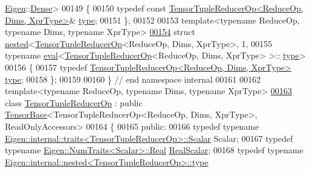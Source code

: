 \begin{DoxyCode}
      \hyperlink{namespace_eigen}{Eigen}::\hyperlink{struct_eigen_1_1_dense}{Dense}>
00149 \{
00150   \textcolor{keyword}{typedef} \textcolor{keyword}{const} \hyperlink{class_eigen_1_1_tensor_tuple_reducer_op}{TensorTupleReducerOp<ReduceOp, Dims, XprType>}&
       \hyperlink{class_eigen_1_1_tensor_tuple_reducer_op}{type};
00151 \};
00152 
00153 \textcolor{keyword}{template}<\textcolor{keyword}{typename} ReduceOp, \textcolor{keyword}{typename} Dims, \textcolor{keyword}{typename} XprType>
\hyperlink{struct_eigen_1_1internal_1_1nested_3_01_tensor_tuple_reducer_op_3_01_reduce_op_00_01_dims_00_01_821bbc2beef8f62325eb5ce9ac37fcf5}{00154} \textcolor{keyword}{struct }\hyperlink{struct_eigen_1_1internal_1_1nested}{nested}<\hyperlink{class_eigen_1_1_tensor_tuple_reducer_op}{TensorTupleReducerOp}<ReduceOp, Dims, XprType>, 1,
00155               typename \hyperlink{struct_eigen_1_1internal_1_1eval}{eval}<\hyperlink{class_eigen_1_1_tensor_tuple_reducer_op}{TensorTupleReducerOp}<ReduceOp, Dims, XprType> >::
      \hyperlink{class_eigen_1_1_tensor_tuple_reducer_op}{type}>
00156 \{
00157   \textcolor{keyword}{typedef} \hyperlink{class_eigen_1_1_tensor_tuple_reducer_op}{TensorTupleReducerOp<ReduceOp, Dims, XprType>} 
      \hyperlink{class_eigen_1_1_tensor_tuple_reducer_op}{type};
00158 \};
00159 
00160 \}  \textcolor{comment}{// end namespace internal}
00161 
00162 \textcolor{keyword}{template}<\textcolor{keyword}{typename} ReduceOp, \textcolor{keyword}{typename} Dims, \textcolor{keyword}{typename} XprType>
\hyperlink{class_eigen_1_1_tensor_tuple_reducer_op}{00163} \textcolor{keyword}{class }\hyperlink{class_eigen_1_1_tensor_tuple_reducer_op}{TensorTupleReducerOp} : \textcolor{keyword}{public} \hyperlink{class_eigen_1_1_tensor_base}{TensorBase}<TensorTupleReducerOp<ReduceOp,
       Dims, XprType>, ReadOnlyAccessors>
00164 \{
00165   \textcolor{keyword}{public}:
00166   \textcolor{keyword}{typedef} \textcolor{keyword}{typename} \hyperlink{struct_eigen_1_1internal_1_1traits}{Eigen::internal::traits<TensorTupleReducerOp>::Scalar}
       Scalar;
00167   \textcolor{keyword}{typedef} \textcolor{keyword}{typename} \hyperlink{group___sparse_core___module}{Eigen::NumTraits<Scalar>::Real} 
      \hyperlink{group___sparse_core___module}{RealScalar};
00168   \textcolor{keyword}{typedef} \textcolor{keyword}{typename} \hyperlink{class_eigen_1_1internal_1_1_tensor_lazy_evaluator_writable}{Eigen::internal::nested<TensorTupleReducerOp>::type}

\end{DoxyCode}
